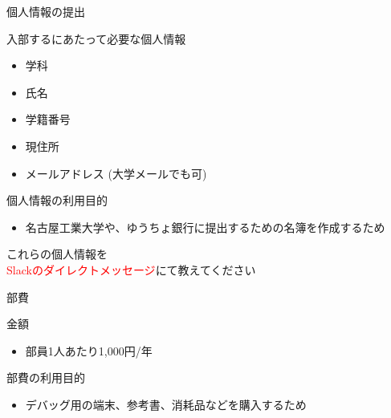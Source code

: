 \documentclass[12pt, unicode]{beamer}
\begin{document}
\begin{frame}{個人情報の提出}
    \begin{block}{入部するにあたって必要な個人情報}
        \begin{itemize}
            \item 学科
            \item 氏名
            \item 学籍番号
            \item 現住所
            \item メールアドレス (大学メールでも可)
        \end{itemize}
    \end{block}

    \begin{block}{個人情報の利用目的}
        \begin{itemize}
            \item 名古屋工業大学や、ゆうちょ銀行に提出するための名簿を作成するため
        \end{itemize}
    \end{block}

    \begin{center}
        {\large これらの個人情報を\\\textcolor{red}{Slackのダイレクトメッセージ}にて教えてください}
    \end{center}
\end{frame}

\begin{frame}{部費}
    \begin{block}{金額}
        \begin{itemize}
            \item 部員1人あたり1,000円/年
        \end{itemize}
    \end{block}

    \begin{block}{部費の利用目的}
        \begin{itemize}
            \item デバッグ用の端末、参考書、消耗品などを購入するため
        \end{itemize}
    \end{block}
\end{frame}
\end{document}
